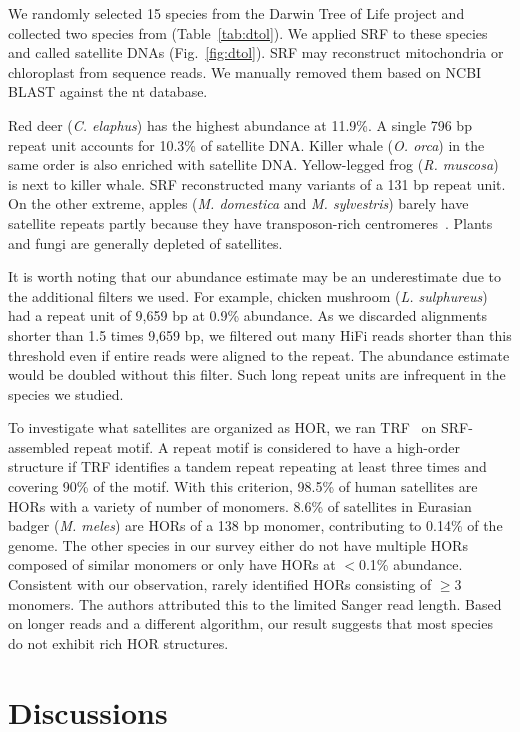\documentclass{bioinfo}
\begin{document}
We randomly selected 15 species from the Darwin Tree of Life project and
collected two species from \citet{Hon:2020aa} (Table~\ref{tab:dtol}). We applied
SRF to these species and called satellite DNAs (Fig.~\ref{fig:dtol}).
SRF may reconstruct mitochondria or chloroplast from sequence reads.
We manually removed them based on NCBI BLAST against the nt database.

Red deer (\emph{C. elaphus}) has the highest abundance at 11.9\%. A single
796 bp repeat unit accounts for 10.3\% of satellite DNA. Killer whale (\emph{O.
orca}) in the same order is also enriched with satellite DNA. Yellow-legged
frog (\emph{R. muscosa}) is next to killer whale. SRF reconstructed many
variants of a 131 bp repeat unit. On the other extreme, apples (\emph{M.
domestica} and \emph{M. sylvestris}) barely have satellite repeats partly
because they have transposon-rich centromeres~\citep{Zhang:2019ab}. Plants and
fungi are generally depleted of satellites.

It is worth noting that our abundance estimate may be an underestimate due to
the additional filters we used. For example, chicken mushroom (\emph{L.
sulphureus}) had a repeat unit of 9,659 bp at 0.9\% abundance. As we discarded
alignments shorter than 1.5 times 9,659 bp, we filtered out many HiFi reads
shorter than this threshold even if entire reads were aligned to the repeat.
The abundance estimate would be doubled without this filter. Such long repeat
units are infrequent in the species we studied.

To investigate what satellites are organized as HOR, we ran
TRF~\citep{Benson:1999aa} on SRF-assembled repeat motif. A repeat motif is
considered to have a high-order structure if TRF identifies a tandem repeat
repeating at least three times and covering 90\% of the motif. With this
criterion, 98.5\% of human satellites are HORs with a variety of number of
monomers. 8.6\% of satellites in Eurasian badger (\emph{M. meles}) are HORs of
a 138 bp monomer, contributing to 0.14\% of the genome. The other species in
our survey either do not have multiple HORs composed of similar monomers or
only have HORs at $<$0.1\% abundance. Consistent with our observation,
\citet{Melters:2013va} rarely identified HORs consisting of $\ge$3 monomers.
The authors attributed this to the limited Sanger read length. Based on longer
reads and a different algorithm, our result suggests that most species do not
exhibit rich HOR structures.

\section{Discussions}
\end{document}
